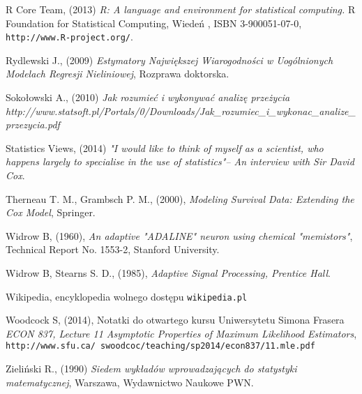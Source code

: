 \begin{thebibliography}{99}
 R Core Team, (2013) \textit{R: A language and environment for statistical computing.} R Foundation for Statistical Computing, Wiedeń , ISBN 3-900051-07-0, \texttt{http://www.R-project.org/}.

 Rydlewski J., (2009) \textit{Estymatory Największej Wiarogodności w Uogólnionych Modelach Regresji Nieliniowej}, Rozprawa doktorska.

 Sokołowski A., (2010) \textit{Jak rozumieć i wykonywać analizę przeżycia} \textit{http://www.statsoft.pl/Portals/0/Downloads/Jak\_rozumiec\_i\_wykonac\_analize\_przezycia.pdf}

 Statistics Views, (2014) \textit{ "I would like to think of myself as a scientist, who happens largely to specialise in the use of statistics"– An interview with Sir David Cox}. 

 Therneau T. M., Grambsch P. M., (2000), \textit{Modeling Survival Data: Extending the Cox Model}, Springer.

 Widrow B, (1960), \textit{An adaptive "ADALINE" neuron using chemical "memistors"}, Technical Report No. 1553-2, Stanford University.

 Widrow B, Stearns S. D., (1985), \textit{Adaptive Signal Processing, Prentice Hall}.

 Wikipedia, encyklopedia wolnego dostępu \texttt{wikipedia.pl}
 
  Woodcock S, (2014), Notatki do otwartego kursu Uniwersytetu Simona Frasera \textit{ECON 837, Lecture 11 Asymptotic Properties of Maximum Likelihood Estimators}, \\ \texttt{http://www.sfu.ca/~swoodcoc/teaching/sp2014/econ837/11.mle.pdf}
 
 Zieliński R., (1990) \textit{Siedem wykładów wprowadzających do statystyki matematycznej}, Warszawa, Wydawnictwo Naukowe PWN.


\end{thebibliography}
